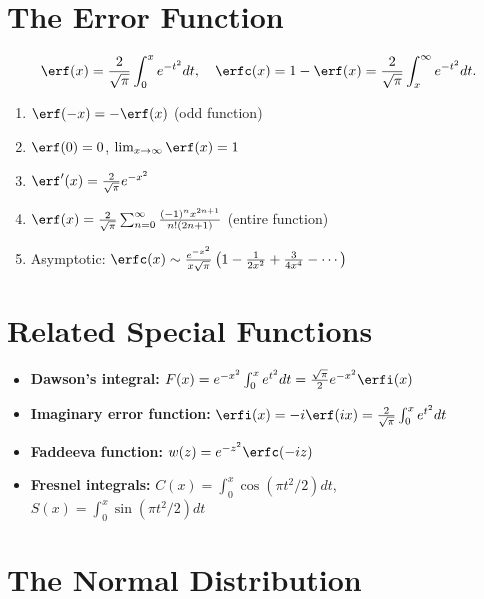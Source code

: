\section{The Error Function}

\begin{definition}
\[
\erf(x) = \frac{2}{\sqrt{\pi}} \int_0^x e^{-t^2} dt, \quad
\erfc(x) = 1 - \erf(x) = \frac{2}{\sqrt{\pi}} \int_x^{\infty} e^{-t^2} dt.
\]
\end{definition}

\begin{theorem}
\begin{enumerate}
    \item $\erf(-x) = -\erf(x)$ (odd function)
    \item $\erf(0) = 0$, $\lim_{x\to\infty} \erf(x) = 1$
    \item $\erf'(x) = \frac{2}{\sqrt{\pi}} e^{-x^2}$
    \item $\erf(x) = \frac{2}{\sqrt{\pi}} \sum_{n=0}^{\infty} \frac{(-1)^n x^{2n+1}}{n!(2n+1)}$ (entire function)
    \item Asymptotic: $\erfc(x) \sim \frac{e^{-x^2}}{x\sqrt{\pi}} \left(1 - \frac{1}{2x^2} + \frac{3}{4x^4} - \cdots \right)$
\end{enumerate}
\end{theorem}

\section{Related Special Functions}

\begin{itemize}
    \item \textbf{Dawson's integral:} $F(x) = e^{-x^2} \int_0^x e^{t^2} dt = \frac{\sqrt{\pi}}{2} e^{-x^2} \erfi(x)$
    \item \textbf{Imaginary error function:} $\erfi(x) = -i \erf(ix) = \frac{2}{\sqrt{\pi}} \int_0^x e^{t^2} dt$
    \item \textbf{Faddeeva function:} $w(z) = e^{-z^2} \erfc(-iz)$
    \item \textbf{Fresnel integrals:} $C(x) = \int_0^x \cos(\pi t^2/2) dt$, $S(x) = \int_0^x \sin(\pi t^2/2) dt$
\end{itemize}

\section{The Normal Distribution}

